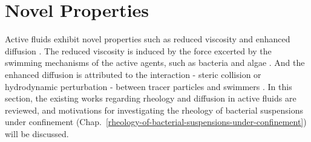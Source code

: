 \section{Novel Properties}
\label{emergent-properties}
Active fluids exhibit novel properties such as reduced viscosity and enhanced diffusion  \cite{Ramaswamy2010}. The reduced viscosity is induced by the force excerted by the swimming mechanisms of the active agents, such as bacteria and algae \cite{Saintillan2018}. And the enhanced diffusion is attributed to the interaction - steric collision or hydrodynamic perturbation - between tracer particles and swimmers
\cite{Wu2000, Peng2016, Caspi2000, Morozov2014, Patteson2016, Leptos2009,
 Yang2016, Valeriani2011, Kurtuldu2011}.
In this section, the existing works regarding rheology and diffusion in active fluids are reviewed, and motivations for investigating the rheology of bacterial suspensions under confinement (Chap.~\ref{rheology-of-bacterial-suspensions-under-confinement}) will be discussed.


